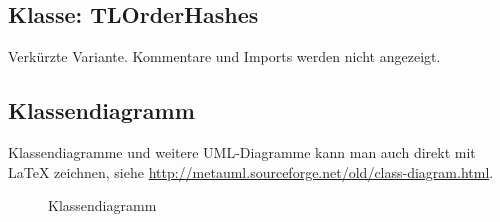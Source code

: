 \subsection{Klasse: TLOrderHashes}
\label{app:OrderHashes}
Verkürzte Variante. Kommentare und Imports werden nicht angezeigt.

\clearpage

\subsection{Klassendiagramm}
\label{app:Klassendiagramm}
Klassendiagramme und weitere \acs{UML}-Diagramme kann man auch direkt mit \LaTeX{} zeichnen, siehe \zB \url{http://metauml.sourceforge.net/old/class-diagram.html}.
\begin{figure}[htb]
\centering
{}
\caption{Klassendiagramm}
\end{figure}
\clearpage


